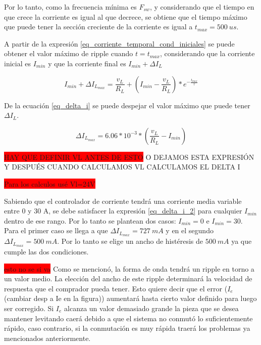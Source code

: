Por lo tanto, como la frecuencia mínima es $F_{sw}$, y considerando que el tiempo en que crece la corriente es igual al que decrece, se obtiene que el tiempo máximo que puede tener la sección creciente de la corriente es igual a $t_{max}=500\:us$. 

A partir de la expresión \ref{eq_corriente_temporal_cond_iniciales} se puede obtener el valor máximo de ripple cuando $t=t_{max}$, considerando que la corriente inicial es $I_{min}$ y que la corriente final es $I_{min}+\Delta I_L$

\begin{equation} \label{eq_delta_i}
	I_{min}+\Delta I_{L_{max}}=\frac{v_L}{R_L}+(I_{min}-\frac{v_L}{R_L})*e^{-\frac{t_{max}}{\tau}}
\end{equation}

De la ecuación \ref{eq_delta_i} se puede despejar el valor máximo que puede tener $\Delta I_L$. 

\begin{equation} \label{eq_delta_i_2}
	\Delta I_{L_{max}}=6.06*10^{-3}*(\frac{v_L}{R_L}-I_{min})
\end{equation}

\colorbox{red}{HAY QUE DEFINIR VL ANTES DE ESTO} O DEJAMOS ESTA EXPRESIÓN Y DESPUÉS CUANDO CALCULAMOS VL CALCULAMOS EL DELTA I

\colorbox{red}{Para los calculos usé Vl=24V}


Sabiendo que el controlador de corriente tendrá una corriente media variable entre 0 y 30 A, se debe satisfacer la expresión \ref{eq_delta_i_2} para cualquier $I_{min}$ dentro de ese rango. Por lo tanto se plantean dos casos: $I_{min}=0$ e $I_{min}=30$. Para el primer caso se llega a que $\Delta I_{L_{max}}=727\:mA$ y en el segundo $\Delta I_{L_{max}}=500\:mA$. Por lo tanto se elige un ancho de histéresis de $500\:mA$ ya que cumple las dos condiciones.



\colorbox{red}{esto no se si va}
Como se mencionó, la forma de onda tendrá un ripple en torno a un valor medio. La elección del ancho de este ripple determinará la velocidad de respuesta que el comprador pueda tener. Esto quiere decir que el error ($I_{e}$(cambiar desp a Ie en la figura)) aumentará hasta cierto valor definido para luego ser corregido. Si $I_{e}$ alcanza un valor demasiado grande la pieza que se desea mantener levitando caerá debido a que el sistema no conmutó lo suficientemente rápido, caso contrario, si la conmutación es muy rápida traerá los problemas ya mencionados anteriormente.

